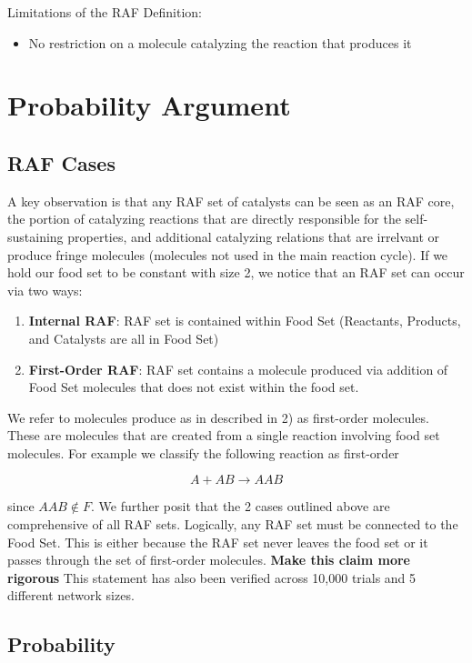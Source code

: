 \documentclass{article}
\begin{document}
Limitations of the RAF Definition:
\begin{itemize}
    \item No restriction on a molecule catalyzing the reaction that produces it
\end{itemize}


\section{Probability Argument}

\subsection{RAF Cases}
A key observation is that any RAF set of catalysts can be seen as an RAF core, the portion of catalyzing reactions that are directly responsible for the self-sustaining properties, and additional catalyzing relations that are irrelvant or produce fringe molecules (molecules not used in the main reaction cycle).
If we hold our food set to be constant with size 2, we notice that an RAF set can occur via two ways: 

\begin{enumerate}
    \item \textbf{Internal RAF}: RAF set is contained within Food Set (Reactants, Products, and Catalysts are all in Food Set)
    \item \textbf{First-Order RAF}: RAF set contains a molecule produced via addition of Food Set molecules that does not exist within the food set.
\end{enumerate}

We refer to molecules produce as in described in 2) as first-order molecules. These are molecules that are created from a single reaction involving food set molecules. For example we classify the following reaction as first-order

$$
A + AB \rightarrow AAB
$$

since $AAB \notin F$. 
We further posit that the 2 cases outlined above are comprehensive of all RAF sets. 
Logically, any RAF set must be connected to the Food Set. This is either because the RAF set never leaves the food set or it passes through the set of first-order molecules. 
\textbf{Make this claim more rigorous}
This statement has also been verified across 10,000 trials and 5 different network sizes. \\


\subsection{Probability}
\end{document}
